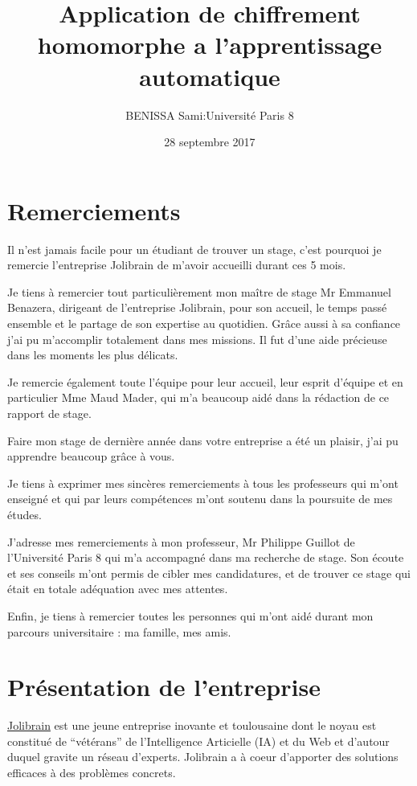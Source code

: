 \documentclass[a4paper,12pt]{article}
\title{Application de chiffrement homomorphe a l'apprentissage automatique}
\author{BENISSA Sami\quad:\quad Université Paris 8}
\date{28 septembre 2017}
\begin{document}
\maketitle
\newpage
\renewcommand{\chaptername}{}
\tableofcontents

\newpage
\section*{Remerciements}
Il n'est jamais facile pour un étudiant de trouver un stage, c'est pourquoi je remercie l'entreprise Jolibrain de m'avoir accueilli durant ces 5 mois.\newline

Je tiens à remercier tout particulièrement mon maître de stage Mr Emmanuel Benazera, dirigeant de l'entreprise Jolibrain, pour son accueil, le temps passé ensemble et le partage de son expertise au quotidien. Grâce aussi à sa confiance j'ai pu m'accomplir totalement dans mes missions. Il fut d'une aide précieuse dans les moments les plus délicats.\newline

Je remercie également toute l'équipe pour leur accueil, leur esprit d'équipe et en particulier Mme Maud Mader, qui m'a beaucoup aidé dans la rédaction de ce rapport de stage.\newline

Faire mon stage de dernière année dans votre entreprise a été un plaisir, j'ai pu apprendre beaucoup grâce à vous.\newline

Je tiens à exprimer mes sincères remerciements à tous les professeurs qui m'ont enseigné et qui par leurs compétences m'ont soutenu dans la poursuite de mes études.\newline

J'adresse mes remerciements à mon professeur, Mr Philippe Guillot de l'Université Paris 8 qui m'a accompagné dans ma recherche de stage. Son écoute et ses conseils m'ont permis de cibler mes candidatures, et de trouver ce stage qui était en totale adéquation avec mes attentes.\newline


Enfin, je tiens à remercier toutes les personnes qui m'ont aidé durant mon parcours universitaire : ma famille, mes amis.\newpage
\section{Présentation de l’entreprise}
\href{http://jolibrain.com/}{Jolibrain} est une jeune entreprise inovante et toulousaine dont le noyau est constitué de ``vétérans'' de l'Intelligence Articielle (IA) et du Web et d'autour duquel gravite un réseau d'experts.
Jolibrain a à coeur d'apporter des solutions efficaces à des problèmes concrets.
\end{document}
